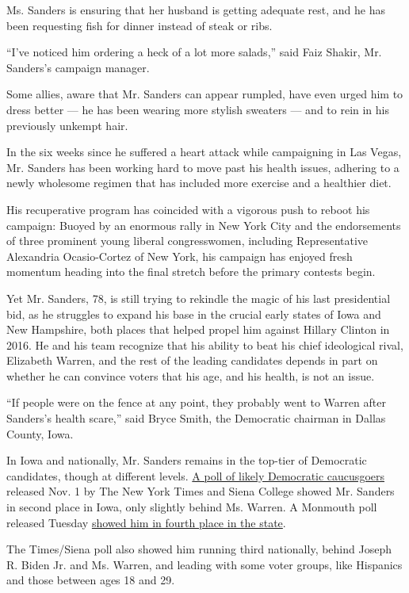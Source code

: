 Ms. Sanders is ensuring that her husband is getting adequate rest, and
he has been requesting fish for dinner instead of steak or ribs.

``I've noticed him ordering a heck of a lot more salads,'' said Faiz
Shakir, Mr. Sanders's campaign manager.

Some allies, aware that Mr. Sanders can appear rumpled, have even urged
him to dress better --- he has been wearing more stylish sweaters ---
and to rein in his previously unkempt hair.

In the six weeks since he suffered a heart attack while campaigning in
Las Vegas, Mr. Sanders has been working hard to move past his health
issues, adhering to a newly wholesome regimen that has included more
exercise and a healthier diet.

His recuperative program has coincided with a vigorous push to reboot
his campaign: Buoyed by an enormous rally in New York City and the
endorsements of three prominent young liberal congresswomen, including
Representative Alexandria Ocasio-Cortez of New York, his campaign has
enjoyed fresh momentum heading into the final stretch before the primary
contests begin.

Yet Mr. Sanders, 78, is still trying to rekindle the magic of his last
presidential bid, as he struggles to expand his base in the crucial
early states of Iowa and New Hampshire, both places that helped propel
him against Hillary Clinton in 2016. He and his team recognize that his
ability to beat his chief ideological rival, Elizabeth Warren, and the
rest of the leading candidates depends in part on whether he can
convince voters that his age, and his health, is not an issue.

``If people were on the fence at any point, they probably went to Warren
after Sanders's health scare,'' said Bryce Smith, the Democratic
chairman in Dallas County, Iowa.

In Iowa and nationally, Mr. Sanders remains in the top-tier of
Democratic candidates, though at different levels.
\href{https://www.nytimes3xbfgragh.onion/2019/11/01/us/politics/iowa-poll-warren-biden.html?module=inline}{A
poll of likely Democratic caucusgoers} released Nov. 1 by The New York
Times and Siena College showed Mr. Sanders in second place in Iowa, only
slightly behind Ms. Warren. A Monmouth poll released Tuesday
\href{https://www.monmouth.edu/polling-institute/reports/monmouthpoll_IA_111219/}{showed
him in fourth place in the state}.

The Times/Siena poll also showed him running third nationally, behind
Joseph R. Biden Jr. and Ms. Warren, and leading with some voter groups,
like Hispanics and those between ages 18 and 29.

